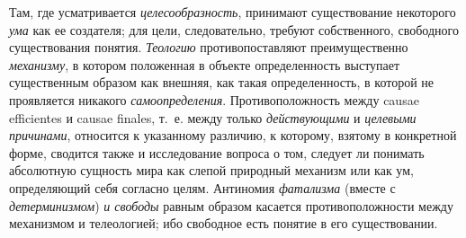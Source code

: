 Там, где усматривается
{\em целесообразность},
принимают существование некоторого
{\em ума} как ее
создателя; для цели, следовательно, требуют собственного, свободного
существования понятия. {\em Теологию}
противопоставляют преимущественно
{\em механизму}, в
котором положенная в объекте определенность выступает существенным образом
как внешняя, как такая определенность, в которой не проявляется никакого
{\em самоопределения}.
Противоположность между causae efficientes и
causae finales, т.~е. между только
{\em действующими} и
{\em целевыми причинами},
относится к указанному различию, к которому, взятому в
конкретной форме, сводится также и исследование вопроса о том, следует ли
понимать абсолютную сущность мира как слепой природный механизм или как ум,
определяющий себя согласно целям. Антиномия
{\em фатализма} (вместе с
{\em детерминизмом})
{\em и свободы} равным
образом касается противоположности между механизмом и телеологией; ибо
свободное есть понятие в его существовании.

